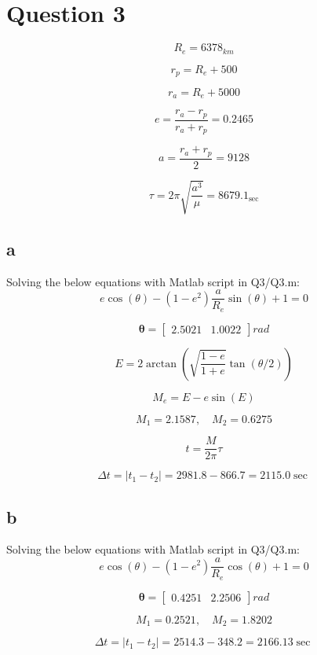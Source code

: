 \section{Question 3}
$$
R_e = 6378_{km}
$$


$$
r_p = R_e + 500
$$

$$
r_a = R_e + 5000
$$

$$
e = 
\dfrac{r_a - r_p}{r_a + r_p} = 0.2465
$$

$$
a = \dfrac{r_a + r_p}{2} = 9128
$$

$$
\tau = 2\pi\sqrt{\dfrac{a^3}{\mu}} = 8679.1_{\sec}
$$
\subsection{a}
Solving the below equations with Matlab script in Q3/Q3.m:
$$
e \cos(\theta) - (1 - e^2) \dfrac{a}{R_e} \sin(\theta) + 1 = 0
$$

$$
\boldsymbol\theta = \begin{bmatrix}
    2.5021 & 1.0022
\end{bmatrix} rad
$$

$$
E = 2 \arctan\left(\sqrt{\dfrac{1-e}{1+e}}  \tan(\theta/2)\right)
$$

$$
M_e = E - e \sin(E)
$$

$$
M_1 = 2.1587, \quad M_2 = 0.6275
$$

$$
t = \dfrac{M}{2\pi}\tau
$$

$$
\Delta t = \vert t_1 - t_2 \vert = 2981.8 - 866.7 = 2115.0 \sec
$$
\subsection{b}
Solving the below equations with Matlab script in Q3/Q3.m:
$$
e \cos(\theta) - (1 - e^2) \dfrac{a}{R_e} \cos(\theta) + 1 = 0
$$

$$
\boldsymbol\theta = \begin{bmatrix}
    0.4251  &  2.2506
\end{bmatrix} rad
$$

$$
M_1 = 0.2521, \quad M_2 = 1.8202
$$

$$
\Delta t = \vert t_1 - t_2 \vert = 2514.3 - 348.2 = 2166.13 \sec
$$

